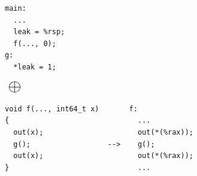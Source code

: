 \begin{figure}[t]
\hspace*{-1.9mm}
\begin{minipage}{0.255\textwidth}
  \begin{Verbatim}[frame=single]
main:
  ...  
  leak = %rsp;
  f(..., 0);
g:
  *leak = 1;
  \end{Verbatim}
\end{minipage}
$\mbox{}~\mathlarger{\mathlarger{\mathlarger{\mathlarger{\mathlarger{\llink}}}}}~\mbox{}$
\hspace*{-1.9mm}
\begin{minipage}{0.595\textwidth}
  \begin{Verbatim}[frame=single]
void f(..., int64_t x)       f:
{                              ...
  out(x);                      out(*(%rax));
  g();                  -->    g();
  out(x);                      out(*(%rax));
}                              ...
  \end{Verbatim}
\end{minipage}
\\[1mm]
\hspace*{-1.9mm}
\begin{minipage}{.95\textwidth}
\end{minipage}

\end{figure}
